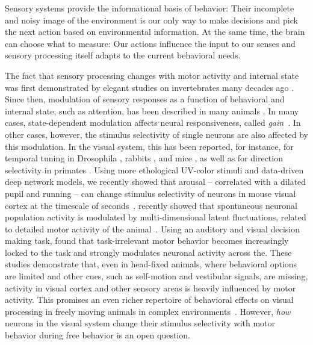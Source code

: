 \documentclass[B2,COG]{ercgrant}
\begin{document}
Sensory systems provide the informational basis of behavior: Their incomplete and noisy image of the environment is our only way to make decisions and pick the next action based on environmental information. 
At the same time, the brain can choose what to measure: Our actions influence the input to our senses and sensory processing itself adapts to the current behavioral needs. 

% 

The fact that sensory processing changes with motor activity and internal state was first demonstrated by elegant studies on invertebrates many decades ago  \parencite{Rowell1971-zj, Wiersma1968-xt}.
Since then, modulation of sensory responses as a function of behavioral and internal state, such as attention, has been described in many animals \parencite[\eg][]{Maimon2010-sa, Niell2010-bs,Bezdudnaya2006-ge, Treue1996-lp, Musall2019-kd}.
In many cases, state-dependent modulation affects neural responsiveness, called \textit{gain}~\parencite{Eggermann2014-xp, Niell2010-bs, McAdams1999-cs,Schroder2020-jl, Dadarlat2017-jw, Mineault2016-fk}.
In other cases, however, the stimulus selectivity of single neurons are also affected by this modulation. 
In the visual system, this has been reported, for instance, for temporal tuning in Drosophila \parencite{Chiappe2010-bm}, rabbits \parencite{Bezdudnaya2006-ge}, and mice \parencite{Andermann2011-vw}, as well as for direction selectivity in primates \parencite{Treue1996-lp}.
Using more ethological UV-color stimuli and data-driven deep network models, we recently showed that arousal -- correlated with a dilated pupil and running -- can change stimulus selectivity of neurons in mouse visual cortex at the timescale of seconds~\parencite{Franke2022-do}. 
\textcite{Stringer2019-lt} recently showed that spontaneous neuronal population activity is modulated by multi-dimensional latent fluctuations, related to detailed motor activity of the animal~\parencite{Syeda2022-bk}.
Using an auditory and visual decision making task, \textcite{Musall2019-kd} found that task-irrelevant motor behavior becomes increasingly locked to the task and strongly modulates neuronal activity across the.
These studies demonstrate that, even in head-fixed animals, where behavioral options are limited and other cues, such as self-motion and vestibular signals, are missing, activity in visual cortex and other sensory areas is heavily influenced by motor activity.
This promises an even richer repertoire of behavioral effects on visual processing in freely moving animals in complex environments~\parencite{Busse2017-rt,Huk2018-ez, Datta2019-qj}.
However, \textit{how} neurons in the visual system change their stimulus selectivity with motor behavior during free behavior is an open question. 
\end{document}
